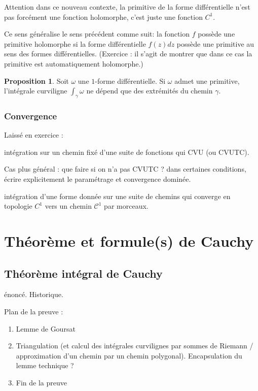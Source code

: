 \documentclass[11pt,a4paper]{book}
\theoremstyle{definition}
\newtheorem{proposition}[theoreme]{Proposition}
\theoremstyle{plain}
\begin{document}
Attention dans ce nouveau contexte, la primitive de la forme différentielle n'est pas forcément  une fonction holomorphe, c'est juste une fonction $C^1$.

Ce sens généralise le sens précédent comme suit: la fonction $f$ possède une primitive holomorphe si la forme différentielle $f(z)dz$ possède une primitive au sens des formes différentielles. (Exercice : il s'agit de montrer que dans ce cas la primitive est automatiquement holomorphe.)

\begin{proposition}
Soit $\omega$ une $1$-forme différentielle.
Si $\omega$ admet une primitive, l'intégrale curviligne  $\int_\gamma \omega$ ne dépend que des extrémités du chemin $\gamma$.
\end{proposition}


\subsection{Convergence}

Laissé en exercice : 

intégration sur un chemin fixé d'une suite de fonctions qui CVU (ou CVUTC).

Cas plus général : que faire si on n'a pas CVUTC ? dans certaines conditions, écrire explicitement le paramétrage et convergence dominée.

intégration d'une forme donnée sur une suite de chemins qui converge en topologie $C^1$ vers un chemin $\mathcal C^1$ par morceaux.




\chapter{Théorème et formule(s) de Cauchy}

\section{Théorème intégral de Cauchy}

énoncé. Historique.

Plan de la preuve : 
\begin{enumerate}
\item Lemme de Goursat
\item Triangulation (et calcul des intégrales curvilignes par sommes de Riemann / approximation d'un chemin par un chemin polygonal). Encapsulation du lemme technique ?
\item Fin de la preuve
\end{enumerate}
\end{document}
